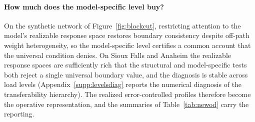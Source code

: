 \paragraph{How much does the model-specific level buy?}\label{sec:levelsdiag}
On the synthetic network of Figure~\ref{fig:blockcut}, restricting
attention to the model's realizable response space restores boundary
consistency despite off-path weight heterogeneity, so the model-specific
level certifies a common account that the universal condition denies. On
Sioux Falls and Anaheim the realizable response spaces are sufficiently
rich that the structural and model-specific tests both reject a single
universal boundary value, and the diagnosis is stable across load levels
(Appendix~\ref{supp:levelsdiag} reports the numerical diagnosis of the
transferability hierarchy). The realized error-controlled profiles
therefore become the operative representation, and the summaries of
Table~\ref{tab:newod} carry the reporting.
